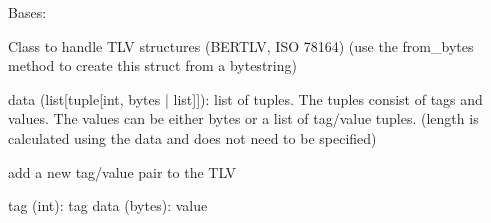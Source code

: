 \documentclass[letterpaper,10pt,english]{sphinxmanual}
\begin{document}
\begin{fulllineitems}
\label{\detokenize{aliro_actuator.access_protocol.tlv:aliro_actuator.access_protocol.tlv.TLV}}
\pysigstartsignatures
{}
\pysigstopsignatures
\sphinxAtStartPar
Bases: 

\sphinxAtStartPar
Class to handle TLV structures (BER\sphinxhyphen{}TLV, ISO 7816\sphinxhyphen{}4)
(use the from\_bytes method to create this struct from a bytestring)
\begin{description}
\sphinxAtStartPar
data (list{[}tuple{[}int, bytes  |  list{]}{]}): list of tuples. The tuples consist of
tags and values. The values can be either bytes or a list of tag/value tuples.
(length is calculated using the data and does not need to be specified)

\end{description}

\begin{fulllineitems}
\label{\detokenize{aliro_actuator.access_protocol.tlv:aliro_actuator.access_protocol.tlv.TLV.add_value}}
\pysigstartsignatures
{}
\pysigstopsignatures
\sphinxAtStartPar
add a new tag/value pair to the TLV
\begin{description}
\sphinxAtStartPar
tag (int): tag
data (bytes): value

\end{description}

\end{fulllineitems}



\end{fulllineitems}
\end{document}
